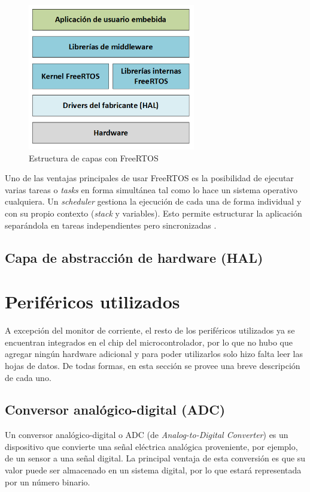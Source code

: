 \begin{figure}[H]
\centering
\includegraphics[width=0.65\textwidth]{./Figures/capas.png}
\caption{Estructura de capas con FreeRTOS}
\label{fig:capas}
\end{figure}

Uno de las ventajas principales de usar FreeRTOS es la posibilidad de ejecutar varias tareas o \textit{tasks} en forma simultánea tal como lo hace un sistema operativo cualquiera. Un \textit{scheduler} gestiona la ejecución de cada una de forma individual y con su propio contexto (\textit{stack} y variables). Esto permite estructurar la aplicación separándola en tareas independientes pero sincronizadas \citep{WEBSITE:FREERTOS}.

\subsection{Capa de abstracción de hardware (HAL)}

\section{Periféricos utilizados}

A excepción del monitor de corriente, el resto de los periféricos utilizados ya se encuentran integrados en el chip del microcontrolador, por lo que no hubo que agregar ningún hardware adicional y para poder utilizarlos solo hizo falta leer las hojas de datos. De todas formas, en esta sección se provee una breve descripción de cada uno.

\subsection{Conversor analógico-digital (ADC)}

Un conversor analógico-digital o ADC (de \textit{Analog-to-Digital Converter}) es un dispositivo que convierte una señal eléctrica analógica proveniente, por ejemplo, de un sensor a una señal digital. La principal ventaja de esta conversión es que su valor puede ser almacenado en un sistema digital, por lo que estará representada por un número binario.

